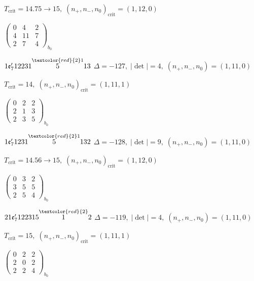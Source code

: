 \documentclass[10pt]{article}
\begin{document}
\hspace{1em}$T_{\text{crit}}=14.75 \to 15,\; (n_+,n_-,n_0)_{\text{crit}}=(1,12,0)$

\hspace{2em}$\left(\begin{smallmatrix}0 & 4 & 2 \\ 4 & 11 & 7 \\ 2 & 7 & 4\end{smallmatrix}\right)_{\!b_0}$

\smallskip

$1\mathfrak{e}_7'12231\overset{\textcolor{red}{2}1}{5}13$ \quad $\Delta=-127,\; |\det|=4,\; (n_+,n_-,n_0)=(1,11,0)$

\hspace{1em}$T_{\text{crit}}=14,\; (n_+,n_-,n_0)_{\text{crit}}=(1,11,1)$

\hspace{2em}$\left(\begin{smallmatrix}0 & 2 & 2 \\ 2 & 1 & 3 \\ 2 & 3 & 5\end{smallmatrix}\right)_{\!b_0}$

\smallskip

$1\mathfrak{e}_7'1231\overset{\textcolor{red}{2}1}{5}132$ \quad $\Delta=-128,\; |\det|=9,\; (n_+,n_-,n_0)=(1,11,0)$

\hspace{1em}$T_{\text{crit}}=14.56 \to 15,\; (n_+,n_-,n_0)_{\text{crit}}=(1,12,0)$

\hspace{2em}$\left(\begin{smallmatrix}0 & 3 & 2 \\ 3 & 5 & 5 \\ 2 & 5 & 4\end{smallmatrix}\right)_{\!b_0}$

\smallskip

$21\mathfrak{e}_7'122315\overset{\textcolor{red}{2}}{1}2$ \quad $\Delta=-119,\; |\det|=4,\; (n_+,n_-,n_0)=(1,11,0)$

\hspace{1em}$T_{\text{crit}}=15,\; (n_+,n_-,n_0)_{\text{crit}}=(1,11,1)$

\hspace{2em}$\left(\begin{smallmatrix}0 & 2 & 2 \\ 2 & 0 & 2 \\ 2 & 2 & 4\end{smallmatrix}\right)_{\!b_0}$
\end{document}
